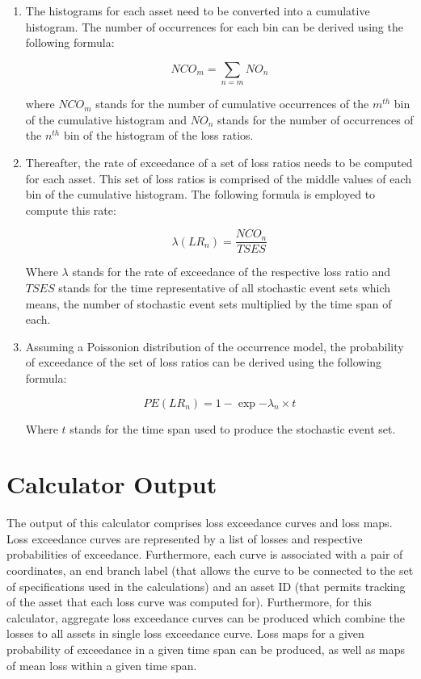 \begin{enumerate}
\item The histograms for each asset need to be converted into a cumulative histogram. The number of occurrences for each bin can be derived using the following formula:

\begin{equation}
NCO_m = \sum_{n=m} NO_n
\end{equation}

where $NCO_m$ stands for the number of cumulative occurrences of the $m^{th}$ bin of the cumulative histogram and $NO_n$ stands for the number of occurrences of the $n^{th}$ bin of the histogram of the loss ratios.

\item Thereafter, the rate of exceedance of a set of loss ratios needs to be computed for each asset. This set of loss ratios is comprised of the middle values of each bin of the cumulative histogram. The following formula is employed to compute this rate:

\begin{equation}
\lambda(LR_n) = \frac{NCO_n}{TSES}
\end{equation}

Where $\lambda$ stands for the rate of exceedance of the respective loss ratio and $TSES$ stands for the time representative of all stochastic event sets which means, the number of stochastic event sets multiplied by the time span of each.

\item Assuming a Poissonion distribution of the occurrence model, the probability of exceedance of the set of loss ratios can be derived using the following formula:

\begin{equation}
PE(LR_n) = 1-\exp{-\lambda_n\times t}
\end{equation}

Where $t$ stands for the time span used to produce the stochastic event set.

\end{enumerate}

\section{Calculator Output}
The output of this calculator comprises loss exceedance curves and loss maps. Loss exceedance curves are represented by a list of losses and respective probabilities of exceedance. Furthermore, each curve is associated with a pair of coordinates, an end branch label (that allows the curve to be connected to the set of specifications used in the calculations) and an asset ID (that permits tracking of the asset that each loss curve was computed for). Furthermore, for this calculator, aggregate loss exceedance curves can be produced which combine the losses to all assets in single loss exceedance curve.  Loss maps for a given probability of exceedance in a given time span can be produced, as well as maps of mean loss within a given time span.
